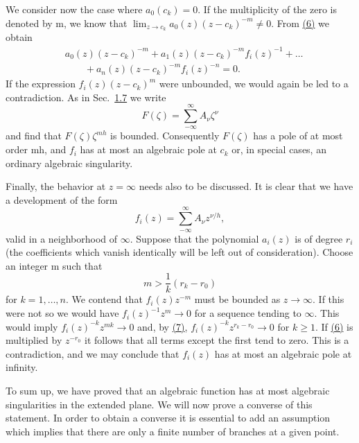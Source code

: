 We consider now the case where $a_{0}(c_{k}) = 0$. If the multiplicity of the zero is denoted by m, we know that $\lim_{z \to c_{k}} a_{0}(z)(z - c_{k})^{-m} \neq 0$. From \hyperref[eq:8.6]{(6)} we obtain
\begin{equation*}
\begin{aligned}
&a_0(z)(z-c_k)^{-m}+a_1(z)(z-c_k)^{-m}f_i(z)^{-1}+\dots\\
&\qquad+a_n(z)(z-c_k)^{-m}f_i(z)^{-n}=0.
\end{aligned}
\end{equation*}
If the expression $f_{i}(z)(z - c_{k})^{m}$ were unbounded, we would again be led to a contradiction. As in Sec.~\hyperref[sec:8.1.7]{1.7} we write
\begin{equation*}
F (\zeta) = \sum_ {- \infty} ^ {\infty} A _ {\nu} \zeta^ {\nu}
\end{equation*}
and find that $F(\zeta)\zeta^{mh}$ is bounded. Consequently $F(\zeta)$ has a pole of at most order mh, and $f_{i}$ has at most an algebraic pole at $c_{k}$ or, in special cases, an ordinary algebraic singularity.

Finally, the behavior at $z = \infty$ needs also to be discussed. It is clear that we have a development of the form
\begin{equation*}
f _ {i} (z) = \sum_ {- \infty} ^ {\infty} A _ {\nu} z ^ {\nu / h},
\end{equation*}
valid in a neighborhood of $\infty$. Suppose that the polynomial $a_{i}(z)$ is of degree $r_{i}$ (the coefficients which vanish identically will be left out of consideration). Choose an integer m such that
\begin{equation*}
m > \frac {1}{k} (r _ {k} - r _ {0})\tag{7}\label{eq:8.7}
\end{equation*}
for $k = 1, \ldots, n$. We contend that $f_{i}(z)z^{-m}$ must be bounded as $z \to \infty$. If this were not so we would have $f_{i}(z)^{-1}z^{m} \to 0$ for a sequence tending to $\infty$. This would imply $f_{i}(z)^{-k}z^{mk} \to 0$ and, by \hyperref[eq:8.7]{(7)}, $f_{i}(z)^{-k}z^{r_{k}-r_{0}} \to 0$ for $k \geq 1$. If \hyperref[eq:8.6]{(6)} is multiplied by $z^{-r_{0}}$ it follows that all terms except the first tend to zero. This is a contradiction, and we may conclude that $f_{i}(z)$ has at most an algebraic pole at infinity.

To sum up, we have proved that an algebraic function has at most algebraic singularities in the extended plane. We will now prove a converse of this statement. In order to obtain a converse it is essential to add an assumption which implies that there are only a finite number of branches at a given point.

